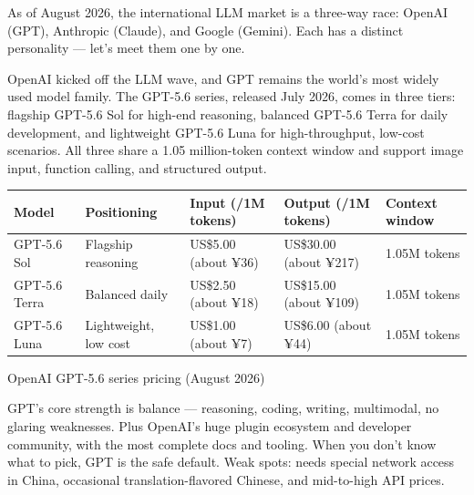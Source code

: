 


As of August 2026, the international LLM market is a three-way race: OpenAI (GPT), Anthropic (Claude), and Google (Gemini). Each has a distinct personality — let's meet them one by one.


OpenAI kicked off the LLM wave, and GPT remains the world's most widely used model family. The GPT-5.6 series, released July 2026, comes in three tiers: flagship GPT-5.6 Sol for high-end reasoning, balanced GPT-5.6 Terra for daily development, and lightweight GPT-5.6 Luna for high-throughput, low-cost scenarios. All three share a 1.05 million-token context window and support image input, function calling, and structured output.

\begin{center}
\begin{tabularx}{\linewidth}{|X|X|X|X|X|}
\hline
\textbf{Model} & \textbf{Positioning} & \textbf{Input (/1M tokens)} & \textbf{Output (/1M tokens)} & \textbf{Context window} \tabularnewline
\hline
GPT-5.6 Sol & Flagship reasoning & US\$5.00 (about ¥36) & US\$30.00 (about ¥217) & 1.05M tokens \tabularnewline
GPT-5.6 Terra & Balanced daily & US\$2.50 (about ¥18) & US\$15.00 (about ¥109) & 1.05M tokens \tabularnewline
GPT-5.6 Luna & Lightweight, low cost & US\$1.00 (about ¥7) & US\$6.00 (about ¥44) & 1.05M tokens \tabularnewline
\hline
\end{tabularx}
\end{center}

\begin{center}\small\color{gray}OpenAI GPT-5.6 series pricing (August 2026)\end{center}

GPT's core strength is balance — reasoning, coding, writing, multimodal, no glaring weaknesses. Plus OpenAI's huge plugin ecosystem and developer community, with the most complete docs and tooling. When you don't know what to pick, GPT is the safe default. Weak spots: needs special network access in China, occasional translation-flavored Chinese, and mid-to-high API prices.

